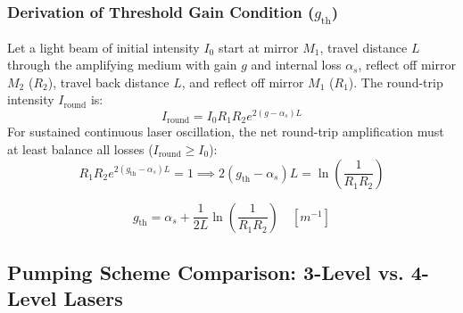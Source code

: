 \subsubsection{Derivation of Threshold Gain Condition (\texorpdfstring{$g_{\text{th}}$}{g_th})}
Let a light beam of initial intensity $I_0$ start at mirror $M_1$, travel distance $L$ through the amplifying medium with gain $g$ and internal loss $\alpha_s$, reflect off mirror $M_2$ ($R_2$), travel back distance $L$, and reflect off mirror $M_1$ ($R_1$). The round-trip intensity $I_{\text{round}}$ is:
\begin{equation}
    I_{\text{round}} = I_0 R_1 R_2 e^{2(g - \alpha_s)L}
\end{equation}
For sustained continuous laser oscillation, the net round-trip amplification must at least balance all losses ($I_{\text{round}} \ge I_0$):
\begin{equation}
    R_1 R_2 e^{2(g_{\text{th}} - \alpha_s)L} = 1 \implies 2(g_{\text{th}} - \alpha_s)L = \ln\left( \frac{1}{R_1 R_2} \right)
\end{equation}

\begin{keyequation}
\begin{equation}
    g_{\text{th}} = \alpha_s + \frac{1}{2L} \ln\left( \frac{1}{R_1 R_2} \right) \quad [\si{m^{-1}}]
\end{equation}
\end{keyequation}

\subsection{Pumping Scheme Comparison: 3-Level vs. 4-Level Lasers}

